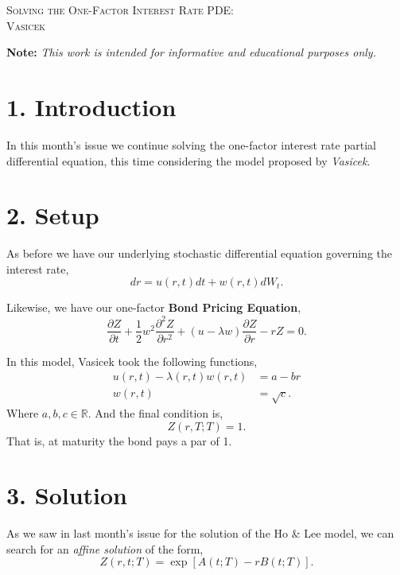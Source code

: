 \documentclass[11pt]{article}
\begin{document}

\begin{tcolorbox}
\begin{center}
    \large
    \textsc{Solving the One-Factor Interest Rate PDE: \\ Vasicek}
\end{center}
\end{tcolorbox}

\begin{center}
\textbf{Note:} \textit{This work is intended for informative and educational purposes only.}
\end{center}

\section*{1. Introduction}
In this month's issue we continue solving the one-factor interest rate partial differential equation, this time considering the model proposed by \textit{Vasicek}.

\section*{2. Setup}
As before we have our underlying stochastic differential equation governing the interest rate,
\begin{equation}
    dr = u(r,t)dt + w(r,t)dW_t.
\end{equation}

Likewise, we have our one-factor \textbf{Bond Pricing Equation},
\begin{equation}
    \frac{\partial Z}{\partial t} + \frac{1}{2} w^2 \frac{\partial^2 Z}{\partial r^2} + (u - \lambda w) \frac{\partial Z}{\partial r} - rZ = 0.
\end{equation}

In this model, Vasicek took the following functions,
\begin{align}
    u(r,t) - \lambda(r,t) w(r,t) &= a - b r \\
    w(r,t) &= \sqrt{c}.
\end{align}
Where $a,b, c \in \mathbb{R}$. And the final condition is,
\begin{equation}
    Z(r,T;T) = 1.
\end{equation}
That is, at maturity the bond pays a par of 1.

\section*{3. Solution}
As we saw in last month's issue for the solution of the Ho \& Lee model, we can search for an \textit{affine solution} of the form,
\begin{equation}
    Z(r,t;T) = \exp \left[ A(t;T) - r B(t;T) \right].
\end{equation}
\end{document}
